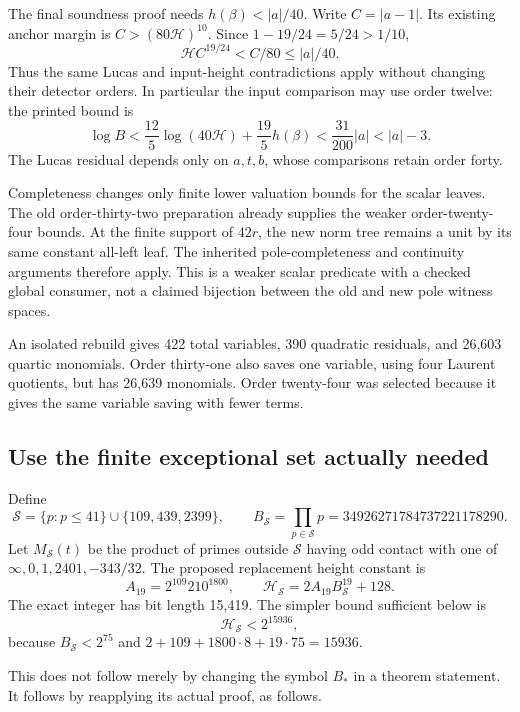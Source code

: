 The final soundness proof needs $h(\beta)<|a|/40$. Write
$C=|a-1|$. Its existing anchor margin is $C>(80\mathcal H)^{10}$.
Since $1-19/24=5/24>1/10$,
\[
 \mathcal H C^{19/24}<C/80\le |a|/40.
\]
Thus the same Lucas and input-height contradictions apply without
changing their detector orders. In particular the input comparison may
use order twelve: the printed bound is
\[
 \log B<\frac{12}{5}\log(40\mathcal H)
             +\frac{19}{5}h(\beta)
 <\frac{31}{200}|a|<|a|-3.
\]
The Lucas residual depends only on $a,t,b$, whose comparisons retain
order forty.

Completeness changes only finite lower valuation bounds for the scalar
leaves. The old order-thirty-two preparation already supplies the weaker
order-twenty-four bounds. At the finite support of $42r$, the new norm
tree remains a unit by its same constant all-left leaf. The inherited
pole-completeness and continuity arguments therefore apply. This is a
weaker scalar predicate with a checked global consumer, not a claimed
bijection between the old and new pole witness spaces.

An isolated rebuild gives 422 total variables, 390 quadratic residuals,
and 26,603 quartic monomials. Order thirty-one also saves one variable,
using four Laurent quotients, but has 26,639 monomials. Order twenty-four
was selected because it gives the same variable saving with fewer terms.

\subsection{Use the finite exceptional set actually needed}

Define
\[
 \mathcal S=\{p:p\le41\}\cup\{109,439,2399\},
 \qquad B_{\mathcal S}=\prod_{p\in\mathcal S}p
 =34926271784737221178290.
\]
Let $M_{\mathcal S}(t)$ be the product of primes outside $\mathcal S$
having odd contact with one of
$\infty,0,1,2401,-343/32$. The proposed replacement height constant is
\[
 A_{19}=2^{109}210^{1800},\qquad
 \mathcal H_{\mathcal S}=2A_{19}B_{\mathcal S}^{19}+128.
\]
The exact integer has bit length 15,419. The simpler bound sufficient
below is
\[
 \mathcal H_{\mathcal S}<2^{15936},
\]
because $B_{\mathcal S}<2^{75}$ and
$2+109+1800\cdot8+19\cdot75=15936$.

This does not follow merely by changing the symbol $B_*$ in a theorem
statement. It follows by reapplying its actual proof, as follows.

